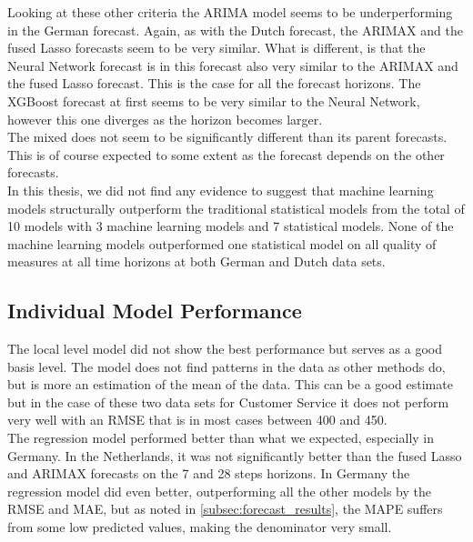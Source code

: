 Looking at these other criteria the ARIMA model seems to be underperforming in the German forecast. Again, as with the Dutch forecast, the ARIMAX and the fused Lasso forecasts seem to be very similar. What is different, is that the Neural Network forecast is in this forecast also very similar to the ARIMAX and the fused Lasso forecast. This is the case for all the forecast horizons. The XGBoost forecast at first seems to be very similar to the Neural Network, however this one diverges as the horizon becomes larger.\\

The mixed does not seem to be significantly different than its parent forecasts. This is of course expected to some extent as the forecast depends on the other forecasts.\\

In this thesis, we did not find any evidence to suggest that machine learning models structurally outperform the traditional statistical models from the total of 10 models with 3 machine learning models and 7 statistical models. None of the machine learning models outperformed one statistical model on all quality of measures at all time horizons at both German and Dutch data sets.\\

\subsection{Individual Model Performance}
The local level model did not show the best performance but serves as a good basis level. The model does not find patterns in the data as other methods do, but is more an estimation of the mean of the data. This can be a good estimate but in the case of these two data sets for Customer Service it does not perform very well with an RMSE that is in most cases between 400 and 450.\\

The regression model performed better than what we expected, especially in Germany. In the Netherlands, it was not significantly better than the fused Lasso and ARIMAX forecasts on the 7 and 28 steps horizons. In Germany the regression model did even better, outperforming all the other models by the RMSE and MAE, but as noted in \autoref{subsec:forecast_results}, the MAPE suffers from some low predicted values, making the denominator very small.\\

